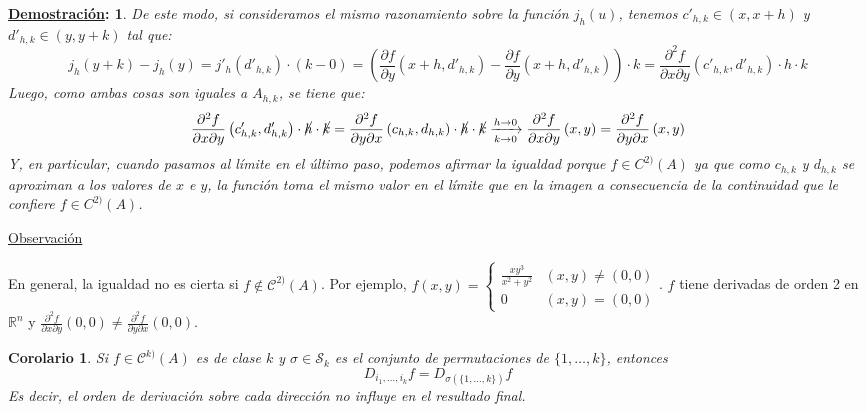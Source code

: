 \documentclass[10pt,a4paper,openright]{book}
\theoremstyle{break}
\newtheorem*{coro}{Corolario}
\newtheorem*{demo}{\underline{Demostración}:}
\begin{document}
\begin{demo}
De este modo, si consideramos el mismo razonamiento sobre la función $j_h(u)$, tenemos $c'_{h,k}\in (x, x+h)$ y $d'_{h,k}\in (y, y+k)$ tal que:
$$j_h(y+k) - j_h (y) = j'_h(d'_{h,k}) \cdot (k-0) = \left( \frac{\partial f}{\partial y}\left(x + h, d'_{h,k}\right) - \frac{\partial f}{\partial y}\left(x+h, d'_{h,k}\right)\right) \cdot k = \frac{\partial^{2}f}{\partial x \partial y}\left(c'_{h,k}, d'_{h,k}\right) \cdot h \cdot k$$
Luego, como ambas cosas son iguales a $A_{h,k}$, se tiene que:
$$\frac{\partial^{2}f}{\partial x \partial y}\left(c'_{h,k}, d'_{h,k}\right) \cdot \cancel{h} \cdot \cancel{k} = \frac{\partial^{2}f}{\partial y \partial x}\left(c_{h,k}, d_{h,k}\right) \cdot \cancel{h} \cdot \cancel{k} \xrightarrow[k\rightarrow 0]{h\rightarrow 0} \frac{\partial^{2}f}{\partial x \partial y}\left(x,y \right)= \frac{\partial^{2}f}{\partial y \partial x}\left( x,y\right) $$
Y, en particular, cuando pasamos al límite en el último paso, podemos afirmar la igualdad porque $f\in C^{2)}(A)$ ya que como $c_{h,k}$ y $d_{h,k}$ se aproximan a los valores de $x$ e $y$, la función toma el mismo valor en el límite que en la imagen a consecuencia de la continuidad que le confiere $f\in C^{2)}(A)$.
\end{demo}

\underline{Observación}

En general, la igualdad no es cierta si $f \notin \mathcal{C}^{2)} (A)$. Por ejemplo, $f(x,y) = \begin{cases} \frac{xy^3}{x^2 + y^2} & (x,y) \neq (0,0) \\ 0 & (x,y) = (0,0) \end{cases}$. $f$ tiene derivadas de orden 2 en $\mathbb{R}^n$ y $\frac{\partial^2 f }{\partial x \partial y} (0,0) \neq \frac{\partial^2 f }{ \partial y\partial x} (0,0)$.

\begin{coro}
Si $f \in \mathcal{C}^{k)} (A)$ es de clase $k$ y $\sigma \in \mathcal{S}_k$ es el conjunto de permutaciones de $\{1, \ldots, k\}$, entonces 
$$D_{i_1, \ldots, i_k} f = D_{\sigma (\{1, \ldots, k\})} f$$
Es decir, el orden de derivación sobre cada dirección no influye en el resultado final.
\end{coro}
\end{document}
